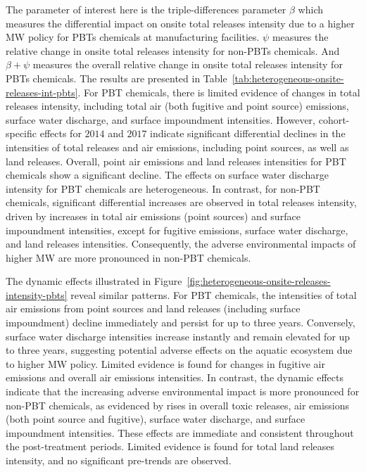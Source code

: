 \documentclass[12pt, english]{article}
\begin{document}
    The parameter of interest here is the triple-differences parameter $\beta$ which measures the differential impact on onsite total releases intensity due to a higher MW policy for PBTs chemicals at manufacturing facilities. $\psi$ measures the relative change in onsite total releases intensity for non-PBTs chemicals. And $\beta + \psi$ measures the overall relative change in onsite total releases intensity for PBTs chemicals. The results are presented in Table~\ref{tab:heterogeneous-onsite-releases-int-pbts}. For PBT chemicals, there is limited evidence of changes in total releases intensity, including total air (both fugitive and point source) emissions, surface water discharge, and surface impoundment intensities. However, cohort-specific effects for $2014$ and $2017$ indicate significant differential declines in the intensities of total releases and air emissions, including point sources, as well as land releases. Overall, point air emissions and land releases intensities for PBT chemicals show a significant decline. The effects on surface water discharge intensity for PBT chemicals are heterogeneous. In contrast, for non-PBT chemicals, significant differential increases are observed in total releases intensity, driven by increases in total air emissions (point sources) and surface impoundment intensities, except for fugitive emissions, surface water discharge, and land releases intensities. Consequently, the adverse environmental impacts of higher MW are more pronounced in non-PBT chemicals.
    

    The dynamic effects illustrated in Figure~\ref{fig:heterogeneous-onsite-releases-intensity-pbts} reveal similar patterns. For PBT chemicals, the intensities of total air emissions from point sources and land releases (including surface impoundment) decline immediately and persist for up to three years. Conversely, surface water discharge intensities increase instantly and remain elevated for up to three years, suggesting potential adverse effects on the aquatic ecosystem due to higher MW policy. Limited evidence is found for changes in fugitive air emissions and overall air emissions intensities. In contrast, the dynamic effects indicate that the increasing adverse environmental impact is more pronounced for non-PBT chemicals, as evidenced by rises in overall toxic releases, air emissions (both point source and fugitive), surface water discharge, and surface impoundment intensities. These effects are immediate and consistent throughout the post-treatment periods. Limited evidence is found for total land releases intensity, and no significant pre-trends are observed.
\end{document}
